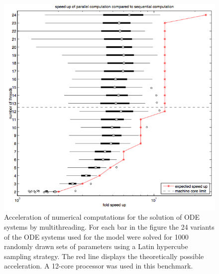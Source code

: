 \documentclass[12pt,a4paper]{scrartcl}
\begin{document}
\begin{figure}
\begin{center}
\includegraphics[width=\textwidth]{./figures_QDM/bachmann_MSB2011_speed_up_test.png}
\end{center}
\caption{Acceleration of numerical computations for the solution of ODE systems by 
multithreading. For each bar in the figure the 24 variants of the ODE systems used for the 
\citet{Bachmann:2011fk} model were solved for 1000 randomly drawn sets of parameters 
using a Latin hypercube sampling strategy. The red line displays the theoretically possible
acceleration. A 12-core processor was used in this benchmark.}
\label{Acceleration}
\end{figure}
\end{document}
